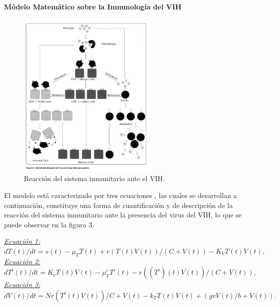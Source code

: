 \documentclass[a4paper,twocolumn,10pt]{article}
\begin{document}
\paragraph{Módelo Matemático sobre la Inmunología del VIH} 
\begin{figure}[htb]
\centering
\includegraphics[width=0.6\textwidth]{./sistemainmuneVIH}
\caption{Reacción del sistema inmunitario ante el VIH. {\cite{Kirschner1996}}}
\label{fig: sistemainmuneVIH}
\end{figure}
El modelo está caracterizado por tres ecuaciones \cite{Kirschner1996}, las cuales se desarrollan a continuación, constituye una forma de cuantificación y de descripción de la reacción del sistema inmunitario ante la presencia del virus del VIH, lo que se puede observar en la figura 3. 
\begin{center}
\doublespacing
{\itshape \underline{Ecuación 1:}} \newline
$dT(t)/dt = s(t)-\mu_TT(t)+ r(T(t)V(t))/(C+V(t))-K_VT(t)V(t),$ \newline
{\itshape \underline {Ecuación 2:}} \newline
$dT^i(t)/dt = K_vT(t)V(t)-\mu_T^iT^i(t)-r((T^i)(t)V(t))/(C+V(t)),$ \newline
{\itshape \underline {Ecuación 3:}} \newline
$dV(t)/dt=Nr(T^i(t)V(t))/C+V(t)-k_TT(t)V(t)+(gvV(t)/b+V(t)). $ \newline
\end{center}
\end{document}
